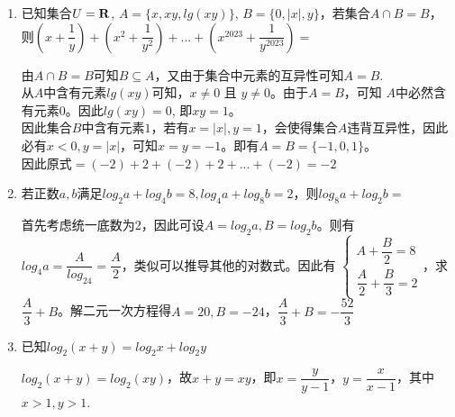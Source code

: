 \begin{enumerate}
\begin{enumerate}
        \item 已知集合$U=\bold{R}$, $A = \{x, xy, lg(xy)\}$, $B = \{0, |x|, y\}$，若集合$A \cap B = B$，则$\left(x+\dfrac{1}{y}\right) + \left(x^2+\dfrac{1}{y^2}\right) + ... + \left(x^{2023}+\dfrac{1}{y^{2023}}\right) = $
        \begin{jieda}
            由$A \cap B = B$可知$B \subseteq A$，又由于集合中元素的互异性可知$A=B$.\\
            从$A$中含有元素$lg(xy)$可知，$x \neq 0$ 且 $y \neq 0$。由于$A=B$，可知 $A$中必然含有元素$0$。因此$lg(xy) = 0$, 即$xy = 1$。\\
            因此集合$B$中含有元素$1$，若有$x = |x|, y = 1$，会使得集合$A$违背互异性，因此必有$x < 0, y = |x|$，可知$x=y=-1$。即有$A = B = \{-1, 0, 1\}$。\\
            因此$\mbox{原式} = (-2)+2+(-2)+2+...+(-2) = -2$
        \end{jieda}
        \item 若正数$a, b$满足$log_2a + log_4b = 8, log_4a + log_8b = 2$，则$log_8a + log_2b = $ 
        \begin{jieda}
            首先考虑统一底数为2，因此可设$A = log_2a, B = log_2b$。则有$log_4a = \dfrac{A}{log_24} = \dfrac{A}{2}$，类似可以推导其他的对数式。因此有
            $\left \{
                \begin{array}{cc}
                     A + \dfrac{B}{2} = 8  \\
                     \dfrac{A}{2} + \dfrac{B}{3} = 2
                \end{array}
                \right.$，求$\dfrac{A}{3} + B$。解二元一次方程得$A = 20, B = -24$，$\dfrac{A}{3} + B = -\dfrac{52}{3}$
        \end{jieda}
        \item 已知$log_2(x+y) = log_2x+log_2y$ \\
        \begin{jieda}
            $log_2(x+y) = log_2(xy)$，故$x+y = xy$，即$x = \dfrac{y}{y-1}$，$y = \dfrac{x}{x-1}$，其中$x > 1, y > 1$.
            \begin{enumerate}[(1)]

\end{enumerate}
\end{jieda}
\end{enumerate}
\end{enumerate}
